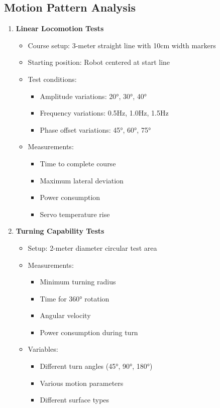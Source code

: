 \documentclass[12pt,a4paper]{report}
\begin{document}
\subsection{Motion Pattern Analysis}
\begin{enumerate}
\item \textbf{Linear Locomotion Tests}
\begin{itemize}
\item Course setup: 3-meter straight line with 10cm width markers
\item Starting position: Robot centered at start line
\item Test conditions:
\begin{itemize}
\item Amplitude variations: 20°, 30°, 40°
\item Frequency variations: 0.5Hz, 1.0Hz, 1.5Hz
\item Phase offset variations: 45°, 60°, 75°
\end{itemize}
\item Measurements:
\begin{itemize}
\item Time to complete course
\item Maximum lateral deviation
\item Power consumption
\item Servo temperature rise
\end{itemize}
\end{itemize}
\item \textbf{Turning Capability Tests}
\begin{itemize}
    \item Setup: 2-meter diameter circular test area
    \item Measurements:
    \begin{itemize}
        \item Minimum turning radius
        \item Time for 360° rotation
        \item Angular velocity
        \item Power consumption during turn
    \end{itemize}
    \item Variables:
    \begin{itemize}
        \item Different turn angles (45°, 90°, 180°)
        \item Various motion parameters
        \item Different surface types
    \end{itemize}
\end{itemize}
\end{enumerate}
\end{document}
